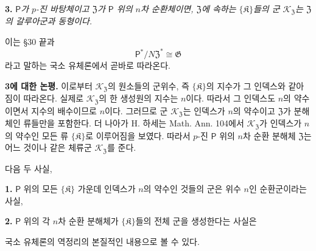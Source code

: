 \noindent\textbf{3.} \emph{\(\mathsf P\)가 \(p\)-진 바탕체이고 \(\mathfrak Z\)가 \(\mathsf P\) 위의 \(n\)차 순환체이면, \(\mathfrak Z\)에 속하는 \(\{\mathfrak K\}\)들의 군 \(\mathscr K_{\mathfrak Z}\)는 \(\mathfrak Z\)의 갈루아군과 동형이다.}

이는 §30 끝과
\[
        \mathsf P^*/N\mathfrak Z^*
        \cong\mathfrak G
\]
라고 말하는 국소 유체론에서 곧바로 따라온다.

\noindent\textbf{3에 대한 논평.} 이로부터 \(\mathscr K_{\mathfrak Z}\)의 원소들의 군위수, 즉 \(\{\mathfrak K\}\)의 지수가 그 인덱스와 같아짐이 따라온다. 실제로 \(\mathscr K_{\mathfrak Z}\)의 한 생성원의 지수는 \(n\)이다. 따라서 그 인덱스도 \(n\)의 약수이면서 지수의 배수이므로 \(n\)이다. 그러므로 군 \(\mathscr K_{\mathfrak Z}\)는 인덱스가 \(n\)의 약수이고 \(\mathfrak Z\)가 분해체인 류들만을 포함한다. 더 나아가 H. 하세는 Math. Ann. 104에서 \(\mathscr K_{\mathfrak Z}\)가 인덱스가 \(n\)의 약수인 모든 류 \(\{\mathfrak K\}\)로 이루어짐을 보였다. 따라서 \(p\)-진 \(\mathsf P\) 위의 \(n\)차 순환 분해체 \(\mathfrak Z\)는 어느 것이나 같은 체류군 \(\mathscr K_{\mathfrak Z}\)를 준다.

다음 두 사실,

\noindent\textbf{1.} \(\mathsf P\) 위의 모든 \(\{\mathfrak K\}\) 가운데 인덱스가 \(n\)의 약수인 것들의 군은 위수 \(n\)인 순환군이라는 사실,

\noindent\textbf{2.} \(\mathsf P\) 위의 각 \(n\)차 순환 분해체가 \(\{\mathfrak K\}\)들의 전체 군을 생성한다는 사실은

국소 유체론의 역정리의 본질적인 내용으로 볼 수 있다.

\clearpage
